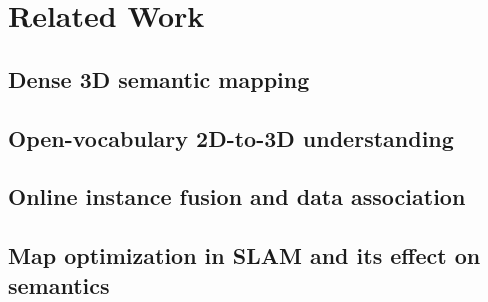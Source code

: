 \chapter{Related Work}
\label{ch:related_work}


\section{Dense 3D semantic mapping}
\label{sec:rw_semantic_mapping}

\section{Open-vocabulary 2D-to-3D understanding}
\label{sec:rw_open_vocabulary}

\section{Online instance fusion and data association}
\label{sec:rw_instance_fusion}

\section{Map optimization in SLAM and its effect on semantics}
\label{sec:rw_map_optimization}
